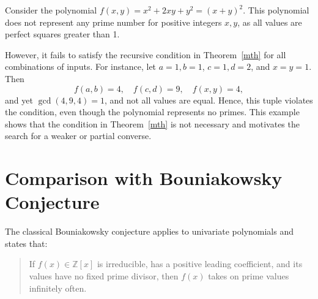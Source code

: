 \documentclass[a4paper,11pt]{article}
\begin{document}
	Consider the polynomial \( f(x, y) = x^2 + 2xy + y^2 = (x + y)^2 \). This polynomial does not represent any prime number for positive integers \( x, y \), as all values are perfect squares greater than 1.
		
	However, it fails to satisfy the recursive condition in Theorem~\ref{mth} for all combinations of inputs. For instance, let \( a = 1, b = 1 \), \( c = 1, d = 2 \), and \( x = y = 1 \). Then
		\[
		f(a,b) = 4,\quad f(c,d) = 9,\quad f(x,y) = 4,
		\]
	and yet \(\gcd(4, 9, 4) = 1\), and not all values are equal. Hence, this tuple violates the condition, even though the polynomial represents no primes. This example shows that the condition in Theorem~\ref{mth} is not necessary and motivates the search for a weaker or partial converse.
	
	
	
	
	
	\section{Comparison with Bouniakowsky Conjecture}
	
	The classical Bouniakowsky conjecture applies to univariate polynomials and states that:
	
	\begin{quote}
		If $f(x) \in \mathbb{Z}[x]$ is irreducible, has a positive leading coefficient, and its values have no fixed prime divisor, then $f(x)$ takes on prime values infinitely often.
	\end{quote}
	
\end{document}

